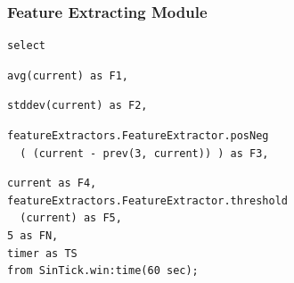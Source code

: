 \documentclass[aspectratio=169]{beamer}
\begin{document}
  \begin{frame}
    \frametitle{Feature Extracting Module}
    \begin{lstlisting}
select
    \end{lstlisting}
    \begin{lstlisting}
avg(current) as F1,
  \end{lstlisting}
    \begin{lstlisting}
stddev(current) as F2,
    \end{lstlisting}
    \begin{lstlisting}
featureExtractors.FeatureExtractor.posNeg
  ( (current - prev(3, current)) ) as F3,
    \end{lstlisting}
    \begin{lstlisting}
current as F4,
featureExtractors.FeatureExtractor.threshold
  (current) as F5,
5 as FN,
timer as TS
from SinTick.win:time(60 sec);
    \end{lstlisting}
  \end{frame}

\end{document}
